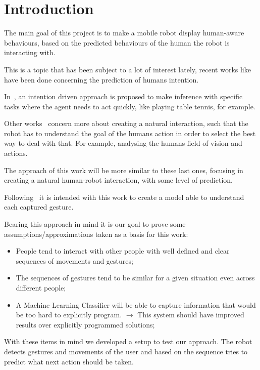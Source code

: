 
\section{Introduction}
The main goal of this project is to make a mobile robot display human-aware behaviours, based on the predicted behaviours of the human the robot is interacting with. 

This is a topic that has been subject to a lot of interest lately, recent works like~\cite{hof} have been done concerning the prediction of humans intention.

In~\cite{wang}, an intention driven approach is proposed to make inference with specific tasks where the agent needs to act quickly, like playing table tennis, for example. 

Other works~\cite{towards,shared} concern more about creating a natural interaction, such that the robot has to understand the goal of the humans action in order to select the best way to deal with that. For example, analysing the humans field of vision and actions. 

The approach of this work will be more similar to these last ones, focusing in creating a natural human-robot interaction, with some level of prediction. 

Following~\cite{recognition, body} it is intended with this work to create a model able to understand each captured gesture.

Bearing this approach in mind it is our goal to prove some assumptions/approximations taken as a basis for this work:  

\begin{itemize}
\item People tend to interact with other people with well defined and clear sequences of movements and gestures;
\item The sequences of gestures tend to be similar for a given situation even across different people;
\item A Machine Learning Classifier will be able to capture information that would be too hard to explicitly program. $\rightarrow$ This system should have improved results over explicitly programmed solutions;
\end{itemize}

With these items in mind we developed a setup to test our approach. The robot detects gestures and movements of the user and based on the sequence tries to predict what next action should be taken.